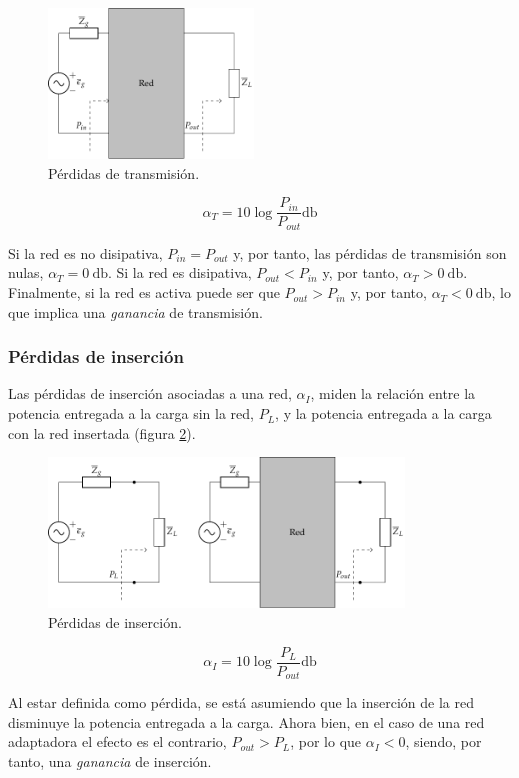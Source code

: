 \begin{figure}[H]
  \centering
  \includegraphics[height=4cm]{../figs/PerdidasTransmision.pdf}
  \caption{Pérdidas de transmisión.}
  \label{fig:perdidas-transmision}
\end{figure}

\begin{equation}
  \alpha_T = 10 \log \frac{P_{in}}{P_{out}} \unit{\decibel}
\end{equation}

Si la red es no disipativa, $P_{in} = P_{out}$ y, por tanto, las
pérdidas de transmisión son nulas, $\alpha_T = \qty{0}{\decibel}$. Si la red es disipativa, $P_{out} < P_{in}$ y, por tanto, $\alpha_T > \qty{0}{\decibel}$. Finalmente, si la red es activa puede ser que $P_{out} > P_{in}$ y, por tanto, $\alpha_T < \qty{0}{\decibel}$, lo que implica una \emph{ganancia} de transmisión.

\subsubsection{Pérdidas de inserción}
\label{sec:perdidas-insercion}

Las pérdidas de inserción asociadas a una red, $\alpha_I$, miden la
relación entre la potencia entregada a la carga sin la red, $P_L$, y
la potencia entregada a la carga con la red insertada (figura
\ref{fig:perdidas-insercion}).

\begin{figure}[H]
  \centering
  \includegraphics[height=4cm]{../figs/PerdidasInsercion.pdf}
  \caption{Pérdidas de inserción.}
  \label{fig:perdidas-insercion}
\end{figure}

\begin{equation}
  \alpha_I = 10 \log \frac{P_L}{P_{out}} \unit{\decibel}
\end{equation}

Al estar definida como pérdida, se está asumiendo que la inserción de
la red disminuye la potencia entregada a la carga. Ahora bien, en el
caso de una red adaptadora el efecto es el contrario, $P_{out} > P_L$,
por lo que $\alpha_I < 0$, siendo, por tanto, una \emph{ganancia} de
inserción.

